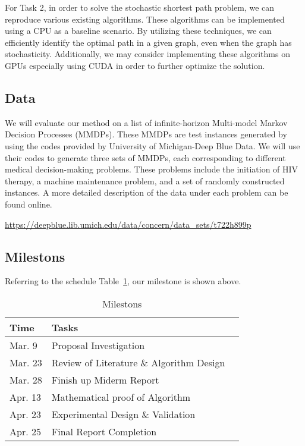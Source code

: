 \documentclass{article}
\begin{document}
For Task 2, in order to solve the stochastic shortest path problem, we can reproduce various 
existing algorithms. These algorithms can be implemented using a CPU as a baseline scenario. 
By utilizing these techniques, we can efficiently identify the optimal path in a given graph, 
even when the graph has stochasticity. Additionally, we may consider implementing these algorithms 
on GPUs especially using CUDA in order to further optimize the solution.

\subsection{Data}

We will evaluate our method on a list of infinite-horizon Multi-model Markov Decision Processes (MMDPs). 
These MMDPs are test instances generated by using the codes provided by University of Michigan-Deep Blue Data. 
We will use their codes to generate three sets of MMDPs, each corresponding to different medical decision-making problems. 
These problems include the initiation of HIV therapy, a machine maintenance problem, and a set of randomly constructed instances. 
A more detailed description of the data under each problem can be found online. 

\begin{center}
  \url{https://deepblue.lib.umich.edu/data/concern/data_sets/t722h899p}
\end{center}

\subsection{Milestons}

Referring to the schedule Table~\ref{Milestons}, our milestone is shown above.


\begin{table}
  \caption{Milestons}
  \label{Milestons}
  \centering
  \begin{tabular}{lll}
    \toprule
    \cmidrule(r){1-2}
    Time     & Tasks \\
    \midrule
    Mar. 9 & Proposal Investigation    \\
    Mar. 23 & Review of Literature \& Algorithm Design   \\
    Mar. 28 & Finish up Miderm Report  \\
    Apr. 13 & Mathematical proof of Algorithm  \\
    Apr. 23 & Experimental Design \& Validation \\
    Apr. 25 & Final Report Completion \\
    \bottomrule
  \end{tabular}
\end{table}
\end{document}
